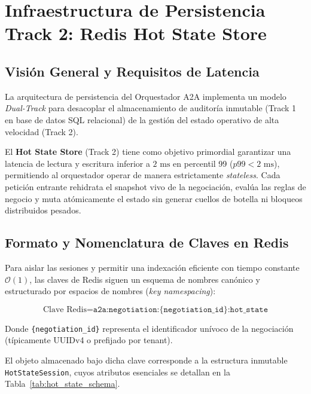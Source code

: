 \section{Infraestructura de Persistencia Track 2: Redis Hot State Store}
\label{sec:persistence}

\subsection{Visión General y Requisitos de Latencia}
La arquitectura de persistencia del Orquestador A2A implementa un modelo \textit{Dual-Track} para desacoplar el almacenamiento de auditoría inmutable (Track 1 en base de datos SQL relacional) de la gestión del estado operativo de alta velocidad (Track 2).

El \textbf{Hot State Store} (Track 2) tiene como objetivo primordial garantizar una latencia de lectura y escritura inferior a $2\text{ ms}$ en percentil 99 ($p99 < 2\text{ ms}$), permitiendo al orquestador operar de manera estrictamente \textit{stateless}. Cada petición entrante rehidrata el snapshot vivo de la negociación, evalúa las reglas de negocio y muta atómicamente el estado sin generar cuellos de botella ni bloqueos distribuidos pesados.

\subsection{Formato y Nomenclatura de Claves en Redis}
Para aislar las sesiones y permitir una indexación eficiente con tiempo constante $\mathcal{O}(1)$, las claves de Redis siguen un esquema de nombres canónico y estructurado por espacios de nombres (\textit{key namespacing}):

\begin{equation}
\text{Clave Redis} = \texttt{a2a:negotiation:\{negotiation\_id\}:hot\_state}
\end{equation}

Donde \texttt{\{negotiation\_id\}} representa el identificador unívoco de la negociación (típicamente UUIDv4 o prefijado por tenant).

El objeto almacenado bajo dicha clave corresponde a la estructura inmutable \texttt{HotStateSession}, cuyos atributos esenciales se detallan en la Tabla~\ref{tab:hot_state_schema}.

